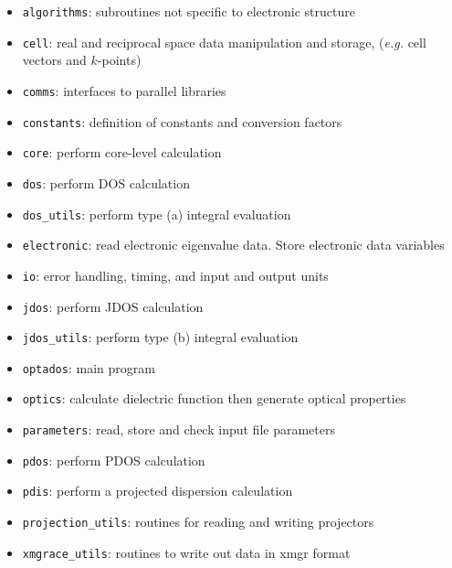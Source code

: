 \documentclass[a4paper,11pt,twoside]{book}
\begin{document}
{\begin{itemize}
\item \texttt{algorithms}: subroutines not specific to electronic structure
\item \texttt{cell}: real and reciprocal space data manipulation and storage, (\emph{e.g.} cell vectors and $k$-points)
\item \texttt{comms}: interfaces to parallel libraries
\item \texttt{constants}: definition of constants and conversion factors
\item \texttt{core}: perform core-level calculation
\item \texttt{dos}: perform DOS calculation
\item \texttt{dos\_utils}: perform type (a) integral evaluation
\item \texttt{electronic}: read electronic eigenvalue data. Store electronic data variables
\item \texttt{io}: error handling, timing, and input and output units
\item \texttt{jdos}: perform JDOS calculation
\item \texttt{jdos\_utils}: perform type (b) integral evaluation
\item \texttt{optados}: main program
\item \texttt{optics}: calculate dielectric function then generate optical properties
\item \texttt{parameters}: read, store and check input file parameters
\item \texttt{pdos}: perform PDOS calculation
\item \texttt{pdis}: perform a projected dispersion calculation
\item \texttt{projection\_utils}: routines for reading and writing projectors
\item \texttt{xmgrace\_utils}: routines to write out data in xmgr format
\end{itemize}

}
\end{document}
